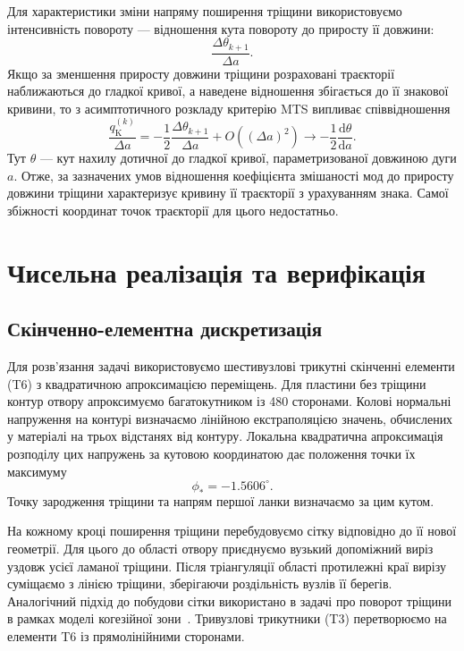 \documentclass[a4paper,12pt]{article}
\newcommand{\dd}{\mathrm{d}}
\newcommand{\PhiStar}{-1.5606}
\begin{document}
Для характеристики зміни напряму поширення тріщини використовуємо інтенсивність повороту ---
відношення кута повороту до приросту її довжини:
\[
 \frac{\Delta\theta_{k+1}}{\Delta a}.
\]
Якщо за зменшення приросту довжини тріщини розраховані траєкторії наближаються до гладкої кривої,
а наведене відношення збігається до її знакової кривини, то з асимптотичного розкладу критерію MTS
випливає співвідношення
\begin{equation}
 \frac{q_{\mathrm K}^{(k)}}{\Delta a}
 =-\frac12\frac{\Delta\theta_{k+1}}{\Delta a}
  +O((\Delta a)^2)
 \longrightarrow-\frac12\frac{\dd\theta}{\dd a}.
 \label{eq:curvature-mts}
\end{equation}
Тут $\theta$ --- кут нахилу дотичної до гладкої кривої, параметризованої довжиною дуги $a$.
Отже, за зазначених умов відношення коефіцієнта змішаності мод до приросту довжини тріщини
характеризує кривину її траєкторії з урахуванням знака.
Самої збіжності координат точок траєкторії для цього недостатньо.

\section{Чисельна реалізація та верифікація}
\label{sec:numerics}
\subsection{Скінченно-елементна дискретизація}
\label{sec:numerical-parameters}
Для розв’язання задачі використовуємо шестивузлові трикутні скінченні елементи (T6) з квадратичною
апроксимацією переміщень. Для пластини без тріщини контур отвору апроксимуємо багатокутником із 480 сторонами.
Колові нормальні напруження на контурі визначаємо лінійною екстраполяцією значень,
обчислених у матеріалі на трьох відстанях від контуру. Локальна квадратична апроксимація
розподілу цих напружень за кутовою координатою дає положення точки їх максимуму
\[
 \phi_*=\PhiStar^\circ.
\]
Точку зародження тріщини та напрям першої ланки визначаємо за цим кутом.

На кожному кроці поширення тріщини перебудовуємо сітку відповідно до її нової геометрії.
Для цього до області отвору приєднуємо вузький допоміжний виріз уздовж усієї ламаної тріщини.
Після тріангуляції області протилежні краї вирізу суміщаємо з лінією тріщини, зберігаючи
роздільність вузлів її берегів. Аналогічний підхід до побудови сітки
використано в задачі про поворот тріщини в рамках моделі когезійної зони~\cite{BogdanovSelivanov2026}.
Тривузлові трикутники (T3) перетворюємо на елементи T6 із прямолінійними сторонами.
\end{document}
